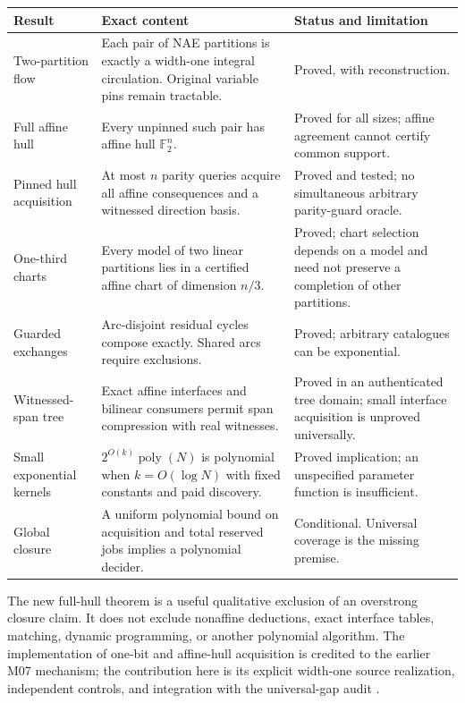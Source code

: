 \documentclass[11pt,letterpaper]{article}
\theoremstyle{definition}
\newcommand{\F}{\mathbb F_2}
\newcommand{\poly}{\operatorname{poly}}
\begin{document}
\begin{longtable}{p{}p{}p{}}
\toprule
Result & Exact content & Status and limitation\\
\midrule
\endhead
Two-partition flow & Each pair of NAE partitions is exactly a width-one integral circulation. Original variable pins remain tractable. & Proved, with reconstruction.\\
Full affine hull & Every unpinned such pair has affine hull $\F^n$. & Proved for all sizes; affine agreement cannot certify common support.\\
Pinned hull acquisition & At most $n$ parity queries acquire all affine consequences and a witnessed direction basis. & Proved and tested; no simultaneous arbitrary parity-guard oracle.\\
One-third charts & Every model of two linear partitions lies in a certified affine chart of dimension $n/3$. & Proved; chart selection depends on a model and need not preserve a completion of other partitions.\\
Guarded exchanges & Arc-disjoint residual cycles compose exactly. Shared arcs require exclusions. & Proved; arbitrary catalogues can be exponential.\\
Witnessed-span tree & Exact affine interfaces and bilinear consumers permit span compression with real witnesses. & Proved in an authenticated tree domain; small interface acquisition is unproved universally.\\
Small exponential kernels & $2^{O(k)}\poly(N)$ is polynomial when $k=O(\log N)$ with fixed constants and paid discovery. & Proved implication; an unspecified parameter function is insufficient.\\
Global closure & A uniform polynomial bound on acquisition and total reserved jobs implies a polynomial decider. & Conditional. Universal coverage is the missing premise.\\
\bottomrule
\end{longtable}

The new full-hull theorem is a useful qualitative exclusion of an overstrong closure claim. It does not exclude nonaffine deductions, exact interface tables, matching, dynamic programming, or another polynomial algorithm. The implementation of one-bit and affine-hull acquisition is credited to the earlier M07 mechanism; the contribution here is its explicit width-one source realization, independent controls, and integration with the universal-gap audit \cite{m07}.
\end{document}
